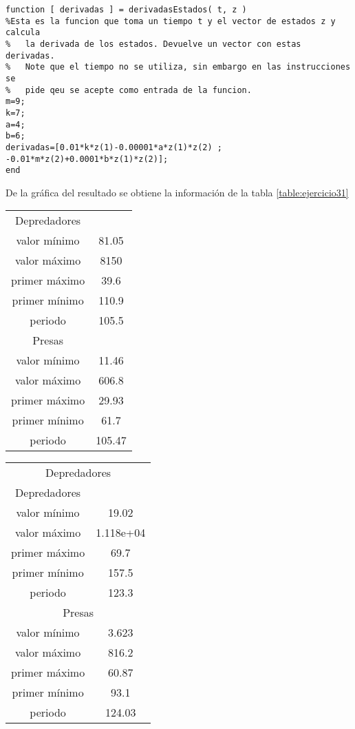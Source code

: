 \documentclass {article}
\begin{document}
\begin{lstlisting}
function [ derivadas ] = derivadasEstados( t, z )
%Esta es la funcion que toma un tiempo t y el vector de estados z y calcula
%   la derivada de los estados. Devuelve un vector con estas derivadas.
%   Note que el tiempo no se utiliza, sin embargo en las instrucciones se
%   pide qeu se acepte como entrada de la funcion.
m=9;
k=7;
a=4;
b=6;
derivadas=[0.01*k*z(1)-0.00001*a*z(1)*z(2) ; -0.01*m*z(2)+0.0001*b*z(1)*z(2)];
end
\end{lstlisting}


De la gráfica del resultado se obtiene la información de la tabla \ref{table:ejercicio31}
\begin{table}
\begin{tabular}{| c | c |}
 Depredadores &  \\ 
 valor mínimo &81.05 \\
 valor máximo &8150\\
 primer máximo&39.6\\
 primer mínimo&110.9\\
 periodo      &105.5\\
 Presas       & \\
 valor mínimo &11.46\\
 valor máximo &606.8\\
 primer máximo&29.93\\
 primer mínimo&61.7\\
 periodo      &105.47\\     
\end{tabular}
\end{table}

\begin{table}
\begin{tabular}{ c c }
  \multicolumn{2}{|c|}{Depredadores} \\
  Depredadores & \\
  valor mínimo &19.02\\
  valor máximo &1.118e+04\\
  primer máximo&69.7\\
  primer mínimo&157.5\\
  periodo      &123.3\\
  \multicolumn{2}{|c|}{Presas} \\
  valor mínimo &3.623\\
  valor máximo &816.2\\
  primer máximo&60.87\\
  primer mínimo&93.1\\
  periodo      &124.03\\ 
\end{tabular}
\end{table}
\end{document}
